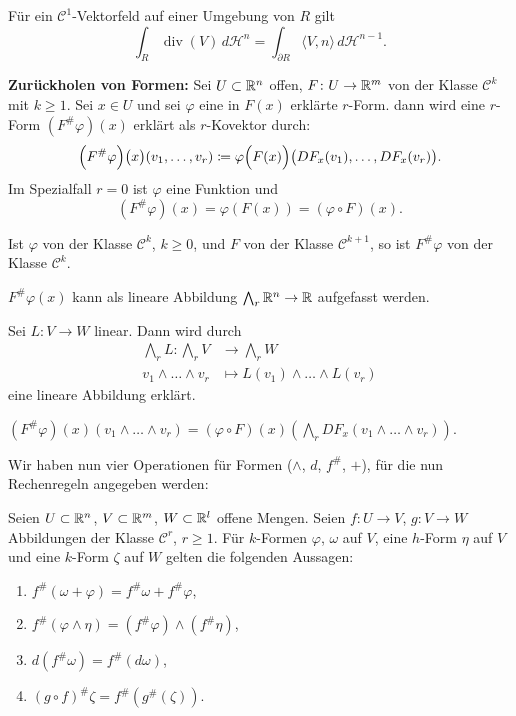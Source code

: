 \documentclass[a4paper,twoside,DIV15,BCOR12mm]{scrbook}
\newcommand{\HM}{\mathscr H}
\newcommand{\bw}{\bigwedge\nolimits}
\DeclareMathOperator{\Div}{div}
\begin{document}
\begin{korollar}
Für ein $\mathcal C^1$-Vektorfeld auf einer Umgebung von $R$ gilt
\[
\int_R \Div(V)\, d\HM^n = \int_{\partial R} \langle V, n\rangle \, d\HM^{n-1}.
\]
\end{korollar}

\textbf{Zurückholen von Formen:}
Sei $U\subset\mathbb{R}^n$ offen, $F\colon U\to \mathbb{R}^m$ von der Klasse $\mathcal C^k$ mit $k\ge 1$. Sei $x\in U$ und sei $\varphi$ eine in $F(x)$ erklärte $r$-Form. dann wird eine $r$-Form $(F^\#\varphi)(x)$ erklärt als $r$-Kovektor durch:
\[
\Big(F^\#\varphi\Big)\big(x\big)(v_1,\ldots,v_r) \da \varphi\Big(F(x)\Big)\big(DF_x(v_1),\ldots,DF_x(v_r)\big).
\]
Im Spezialfall $r=0$ ist $\varphi$ eine Funktion und
\[
(F^\#\varphi)(x) = \varphi(F(x)) = (\varphi\circ F)(x).
\]

\begin{bemerkungen}
\item Ist $\varphi$ von der Klasse $\mathcal C^k$, $k\ge 0$, und $F$ von der Klasse $\mathcal C^{k+1}$, so ist $F^\#\varphi$ von der Klasse $\mathcal C^k$.
\item $F^\#\varphi(x)$ kann als lineare Abbildung $\bw_r\MdR^n\to \MdR$ aufgefasst werden.
\item Sei $L\colon V\to W$ linear. Dann wird durch
\begin{align*}
\bw_rL \colon \bw_r V &\to \bw_r W \\
v_1\wedge\dots\wedge v_r &\mapsto L(v_1)\wedge \dots \wedge L(v_r)
\end{align*}
eine lineare Abbildung erklärt.
\item $(F^\# \varphi)(x)(v_1\wedge\dots\wedge v_r) = (\varphi\circ F)(x)(\bw_r DF_x(v_1\wedge \dots\wedge v_r))$.
\end{bemerkungen}

\pagebreak[3]
Wir haben nun vier Operationen für Formen ($\wedge$, $d$, $f^\#$, $+$), für die nun Rechenregeln angegeben werden:
\begin{lemma}
\label{lem:4.5}
Seien $U\subset \mathbb{R}^n$, $V\subset\mathbb{R}^m$, $W\subset\mathbb{R}^l$ offene Mengen. Seien $f\colon U\to V$, $g\colon V\to W$ Abbildungen der Klasse $\mathcal C^r$, $r\ge 1$.
Für $k$-Formen $\varphi$, $\omega$ auf $V$, eine $h$-Form $\eta$  auf $V$ und eine $k$-Form $\zeta$ auf $W$ gelten die folgenden Aussagen:
\begin{enumerate}
\item $f^\#(\omega + \varphi) = f^\# \omega + f^\# \varphi$,
\item $f^\#(\varphi \wedge \eta) = (f^\# \varphi) \wedge (f^\# \eta)$,
\item $d(f^\# \omega) = f^\#(d\omega)$,
\item $(g\circ f)^\#\zeta = f^\#(g^\#(\zeta))$.
\end{enumerate}
\end{lemma}
\end{document}
